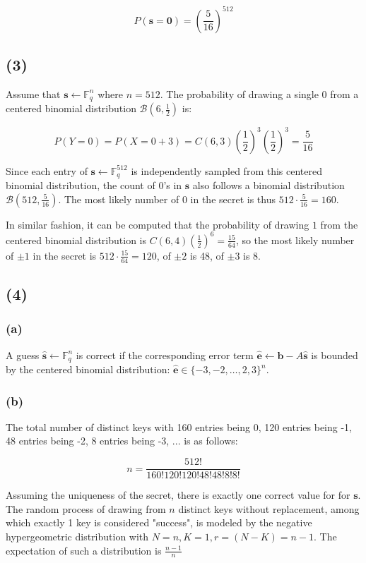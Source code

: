 \documentclass{article}
\begin{document}
$$
P(\mathbf{s} = \mathbf{0}) = (\frac{5}{16})^{512}
$$

\subsection*{(3)}
Assume that $\mathbf{s} \leftarrow \mathbb{F}_q^n$ where $n = 512$. The probability of drawing a single $0$ from a centered binomial distribution $\mathcal{B}(6, \frac{1}{2})$ is:

$$
P(Y=0) = P(X = 0 + 3) = C(6, 3)(\frac{1}{2})^3(\frac{1}{2})^3 = \frac{5}{16}
$$

Since each entry of $\mathbf{s} \leftarrow \mathbb{F}_q^{512}$ is independently sampled from this centered binomial distribution, the count of $0$'s in $\mathbf{s}$ also follows a binomial distribution $\mathcal{B}(512, \frac{5}{16})$. The most likely number of $0$ in the secret is thus $512 \cdot \frac{5}{16} = 160$.

In similar fashion, it can be computed that the probability of drawing $1$ from the centered binomial distribution is $C(6, 4)(\frac{1}{2})^6 = \frac{15}{64}$, so the most likely number of $\pm 1$ in the secret is $512 \cdot \frac{15}{64} = 120$, of $\pm 2$ is 48, of $\pm 3$ is 8.

\subsection*{(4)}
\subsubsection*{(a)}
A guess $\hat{\mathbf{s}} \leftarrow \mathbb{F}_q^n$ is correct if the corresponding error term $\hat{\mathbf{e}} \leftarrow \mathbf{b} - A\hat{\mathbf{s}}$ is bounded by the centered binomial distribution: $\hat{\mathbf{e}} \in \{-3, -2, \ldots, 2, 3\}^n$.

\subsubsection*{(b)}
The total number of distinct keys with 160 entries being 0, 120 entries being -1, 48 entries being -2, 8 entries being -3, ... is as follows:

$$
n = \frac{512!}{160!120!120!48!48!8!8!}
$$

Assuming the uniqueness of the secret, there is exactly one correct value for for $\mathbf{s}$. The random process of drawing from $n$ distinct keys without replacement, among which exactly 1 key is considered "success", is modeled by the negative hypergeometric distribution with $N = n, K = 1, r = (N - K) = n - 1$. The expectation of such a distribution is $\frac{n-1}{n}$
\end{document}
